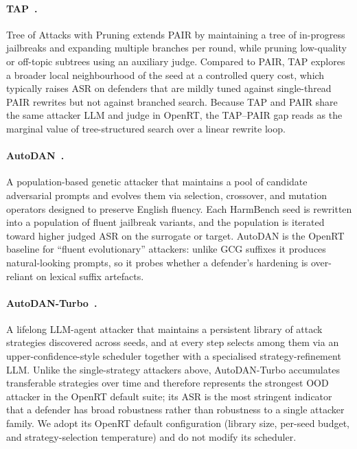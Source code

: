 \documentclass{article}
\begin{document}
\paragraph{TAP~\citep{mehrotra2024tap}.} Tree of Attacks with Pruning extends PAIR by maintaining a tree of in-progress jailbreaks and expanding multiple branches per round, while pruning low-quality or off-topic subtrees using an auxiliary judge. Compared to PAIR, TAP explores a broader local neighbourhood of the seed at a controlled query cost, which typically raises ASR on defenders that are mildly tuned against single-thread PAIR rewrites but not against branched search. Because TAP and PAIR share the same attacker LLM and judge in OpenRT, the TAP--PAIR gap reads as the marginal value of tree-structured search over a linear rewrite loop.

\paragraph{AutoDAN~\citep{liu2023autodan}.} A population-based genetic attacker that maintains a pool of candidate adversarial prompts and evolves them via selection, crossover, and mutation operators designed to preserve English fluency. Each HarmBench seed is rewritten into a population of fluent jailbreak variants, and the population is iterated toward higher judged ASR on the surrogate or target. AutoDAN is the OpenRT baseline for ``fluent evolutionary'' attackers: unlike GCG suffixes it produces natural-looking prompts, so it probes whether a defender's hardening is over-reliant on lexical suffix artefacts.

\paragraph{AutoDAN-Turbo~\citep{liu2024autodan}.} A lifelong LLM-agent attacker that maintains a persistent library of attack strategies discovered across seeds, and at every step selects among them via an upper-confidence-style scheduler together with a specialised strategy-refinement LLM. Unlike the single-strategy attackers above, AutoDAN-Turbo accumulates transferable strategies over time and therefore represents the strongest OOD attacker in the OpenRT default suite; its ASR is the most stringent indicator that a defender has broad robustness rather than robustness to a single attacker family. We adopt its OpenRT default configuration (library size, per-seed budget, and strategy-selection temperature) and do not modify its scheduler.
\end{document}
